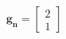 \documentclass[preview]{standalone}
\begin{document}
\begin{align*}
\mathbf{g_n} = \begin{bmatrix} 2 \\ 1 \end{bmatrix}
\end{align*}
\end{document}
